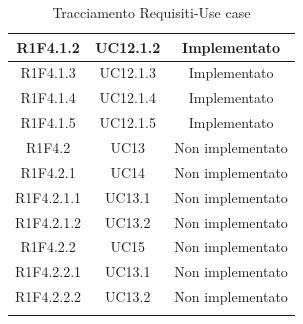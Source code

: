\begin{longtable}{|c|c|c|}
	\hline
	R1F4.1.2 & UC12.1.2 & Implementato\\
	\hline
	R1F4.1.3 & UC12.1.3 & Implementato\\
	\hline
	R1F4.1.4 & UC12.1.4 & Implementato\\
	\hline
	R1F4.1.5 & UC12.1.5 & Implementato\\
	\hline
	R1F4.2 & UC13 & Non implementato\\
	\hline
	R1F4.2.1 & UC14 & Non implementato\\
	\hline
	R1F4.2.1.1 & UC13.1 & Non implementato\\
	\hline
	R1F4.2.1.2 & UC13.2 & Non implementato\\
	\hline
	R1F4.2.2 & UC15 & Non implementato\\
	\hline
	R1F4.2.2.1 & UC13.1 & Non implementato\\
	\hline
	R1F4.2.2.2 & UC13.2 & Non implementato\\
	\hline
	\caption[Tracciamento Requisiti-Use case]{Tracciamento Requisiti-Use case}
\end{longtable}
\clearpage
\normalsize
